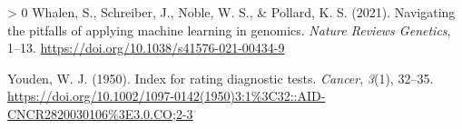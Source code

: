 \documentclass[11pt]{article}
\newlength{\cslhangindent}
\newenvironment{CSLReferences}[3] %
 {%
  \setlength{\parindent}{0pt}
  \ifodd #1 \everypar{\setlength{\hangindent}{\cslhangindent}}\ignorespaces\fi
  \ifnum #2 > 0
  \setlength{\parskip}{#2\baselineskip}
  \fi
 }%
 {}
\begin{document}
\begin{CSLReferences}{1}{0}
\leavevmode\hypertarget{ref-Whalen2021NavPit}{}%
Whalen, S., Schreiber, J., Noble, W. S., \& Pollard, K. S. (2021).
Navigating the pitfalls of applying machine learning in genomics.
\emph{Nature Reviews Genetics}, 1--13.
\url{https://doi.org/10.1038/s41576-021-00434-9}

\leavevmode\hypertarget{ref-Youden1950IndRat}{}%
Youden, W. J. (1950). Index for rating diagnostic tests. \emph{Cancer},
\emph{3}(1), 32--35.
\url{https://doi.org/10.1002/1097-0142(1950)3:1\%3C32::AID-CNCR2820030106\%3E3.0.CO;2-3}

\end{CSLReferences}
\end{document}
